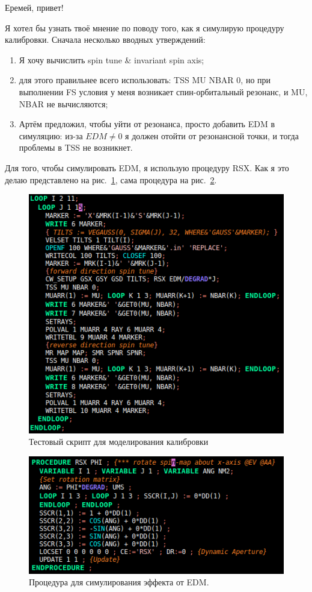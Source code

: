 \documentclass{article}
\begin{document}
Еремей, привет!

Я хотел бы узнать твоё мнение по поводу того, как я симулирую процедуру калибровки.
Сначала несколько вводных утверждений:
\begin{enumerate}
	\item Я хочу вычислить spin tune \& invariant spin axis;
	\item для этого правильнее всего использовать: TSS MU NBAR 0, но при выполнении FS условия у меня возникает спин-орбитальный резонанс, и MU, NBAR не вычисляются;
	\item Артём предложил, чтобы уйти от резонанса, просто добавить EDM в симуляцию: из-за $EDM \neq 0$ я должен отойти от резонансной точки, и тогда проблемы в TSS не возникнет.
\end{enumerate}	

Для того, чтобы симулировать EDM, я использую процедуру RSX. Как я это делаю представлено на рис.~\ref{fig:script}, сама процедура на рис.~\ref{fig:rsx}.
	\begin{figure}[h]
		\includegraphics{CALIB_DANF_SCRIPT}
		\caption{Тестовый скрипт для моделирования калибровки\label{fig:script}}
	\end{figure}
	\begin{figure}[h]
		\includegraphics{RSX_procedure}
		\caption{Процедура для симулирования эффекта от EDM.\label{fig:rsx}}
	\end{figure}
	
\end{document}
